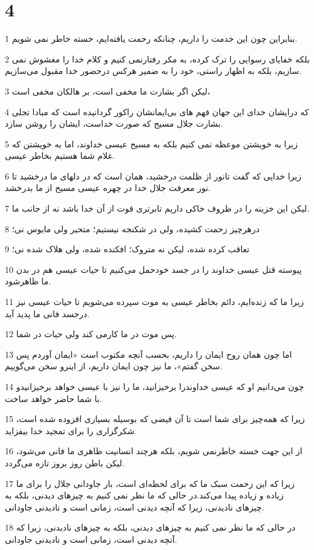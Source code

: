 \chapter{4}

\par 1 بنابراین چون این خدمت را داریم، چنانکه رحمت یافته‌ایم، خسته خاطر نمی شویم.
\par 2 بلکه خفایای رسوایی را ترک کرده، به مکر رفتارنمی کنیم و کلام خدا را مغشوش نمی سازیم، بلکه به اظهار راستی، خود را به ضمیر هرکس درحضور خدا مقبول می‌سازیم.
\par 3 لیکن اگر بشارت ما مخفی است، بر هالکان مخفی است،
\par 4 که درایشان خدای این جهان فهم های بی‌ایمانشان راکور گردانیده است که مبادا تجلی بشارت جلال مسیح که صورت خداست، ایشان را روشن سازد.
\par 5 زیرا به خویشتن موعظه نمی کنیم بلکه به مسیح عیسی خداوند، اما به خویشتن که غلام شما هستیم بخاطر عیسی.
\par 6 زیرا خدایی که گفت تانور از ظلمت درخشید، همان است که در دلهای ما درخشید تا نور معرفت جلال خدا در چهره عیسی مسیح از ما بدرخشد.
\par 7 لیکن این خزینه را در ظروف خاکی داریم تابرتری قوت از آن خدا باشد نه از جانب ما.
\par 8 درهرچیز زحمت کشیده، ولی در شکنجه نیستیم؛ متحیر ولی مایوس نی؛
\par 9 تعاقب کرده شده، لیکن نه متروک؛ افکنده شده، ولی هلاک شده نی؛
\par 10 پیوسته قتل عیسی خداوند را در جسد خودحمل می‌کنیم تا حیات عیسی هم در بدن ما ظاهرشود.
\par 11 زیرا ما که زنده‌ایم، دائم بخاطر عیسی به موت سپرده می‌شویم تا حیات عیسی نیز درجسد فانی ما پدید آید.
\par 12 پس موت در ما کارمی کند ولی حیات در شما.
\par 13 اما چون همان روح ایمان را داریم، بحسب آنچه مکتوب است «ایمان آوردم پس سخن گفتم»، ما نیز چون ایمان داریم، از اینرو سخن می‌گوییم.
\par 14 چون می‌دانیم او که عیسی خداوندرا برخیزانید، ما را نیز با عیسی خواهد برخیزانیدو با شما حاضر خواهد ساخت.
\par 15 زیرا که همه‌چیز برای شما است تا آن فیضی که بوسیله بسیاری افزوده شده است، شکرگزاری را برای تمجید خدا بیفزاید.
\par 16 از این جهت خسته خاطرنمی شویم، بلکه هرچند انسانیت ظاهری ما فانی می‌شود، لیکن باطن روز بروز تازه می‌گردد.
\par 17 زیرا که این زحمت سبک ما که برای لحظه‌ای است، بار جاودانی جلال را برای ما زیاده و زیاده پیدا می‌کند.در حالی که ما نظر نمی کنیم به چیزهای دیدنی، بلکه به چیزهای نادیدنی، زیرا که آنچه دیدنی است، زمانی است و نادیدنی جاودانی.
\par 18 در حالی که ما نظر نمی کنیم به چیزهای دیدنی، بلکه به چیزهای نادیدنی، زیرا که آنچه دیدنی است، زمانی است و نادیدنی جاودانی.

